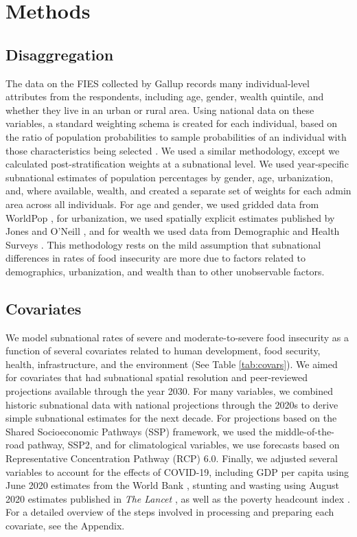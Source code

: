 \documentclass{article}
\begin{document}
\section{Methods}

\subsection{Disaggregation}
The data on the FIES collected by Gallup records many individual-level attributes from the respondents, including age, gender, wealth quintile, and whether they live in an urban or rural area.  Using national data on these variables, a standard weighting schema is created for each individual, based on the ratio of population probabilities to sample probabilities of an individual with those characteristics being selected \citep{bethlehem2009applied}.  We used a similar methodology, except we calculated post-stratification weights at a subnational level.  We used year-specific subnational estimates of population percentages by gender, age, urbanization, and, where available, wealth, and created a separate set of weights for each admin area across all individuals.  For age and gender, we used gridded data from WorldPop \citep{Tatem2017}, for urbanization, we used spatially explicit estimates published by Jones and O'Neill \citep{Jones2016}, and for wealth we used data from Demographic and Health Surveys \citep{dhsall}.  This methodology rests on the mild assumption that subnational differences in rates of food insecurity are more due to factors related to demographics, urbanization, and wealth than to other unobservable factors.

\subsection{Covariates}
We model subnational rates of severe and moderate-to-severe food insecurity as a function of several covariates related to human development, food security, health, infrastructure, and the environment (See Table \ref{tab:covars}).  We aimed for covariates that had subnational spatial resolution and peer-reviewed projections available through the year 2030.  For many variables, we combined historic subnational data with national projections through the 2020s to derive simple subnational estimates for the next decade.  For projections based on the Shared Socioeconomic Pathways (SSP) framework, we used the middle-of-the-road pathway, SSP2, and for climatological variables, we use forecasts based on Representative Concentration Pathway (RCP) 6.0.  Finally, we adjusted several variables to account for the effects of COVID-19, including GDP per capita using June 2020 estimates from the World Bank \citep{prospects2020}, stunting and wasting using August 2020 estimates published in \textit{The Lancet} \citep{headey2020impacts}, as well as the poverty headcount index \cite{Cuaresma2018}.  For a detailed overview of the steps involved in processing and preparing each covariate, see the Appendix.
\end{document}
